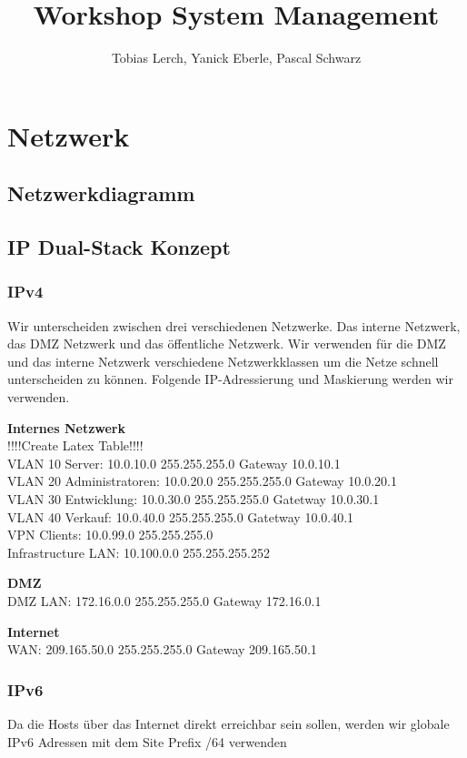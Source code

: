 \documentclass[11pt,a4paper,parskip=half]{scrartcl}
\title{Workshop System Management}
\author{Tobias Lerch, Yanick Eberle, Pascal Schwarz}
\begin{document}
\maketitle
\newpage

\section{Netzwerk}
\subsection{Netzwerkdiagramm}
\subsection{IP Dual-Stack Konzept}
\subsubsection{IPv4}
Wir unterscheiden zwischen drei verschiedenen Netzwerke. Das interne Netzwerk, das DMZ Netzwerk und das öffentliche Netzwerk. Wir verwenden für die DMZ und das interne Netzwerk verschiedene Netzwerkklassen um die Netze schnell unterscheiden zu können. Folgende IP-Adressierung und Maskierung werden wir verwenden.

\textbf{Internes Netzwerk}\\
!!!!Create Latex Table!!!!\\
VLAN 10 Server: 10.0.10.0 255.255.255.0 Gateway 10.0.10.1\\
VLAN 20 Administratoren: 10.0.20.0 255.255.255.0 Gateway 10.0.20.1\\
VLAN 30 Entwicklung: 10.0.30.0 255.255.255.0 Gatetway 10.0.30.1\\
VLAN 40 Verkauf: 10.0.40.0 255.255.255.0 Gatetway 10.0.40.1\\
VPN Clients: 10.0.99.0 255.255.255.0\\
Infrastructure LAN: 10.100.0.0 255.255.255.252

\textbf{DMZ}\\
DMZ LAN: 172.16.0.0 255.255.255.0 Gateway 172.16.0.1

\textbf{Internet}\\
WAN: 209.165.50.0 255.255.255.0 Gateway 209.165.50.1

\subsubsection{IPv6}
Da die Hosts über das Internet direkt erreichbar sein sollen, werden wir globale IPv6 Adressen mit dem Site Prefix /64 verwenden
\end{document}
